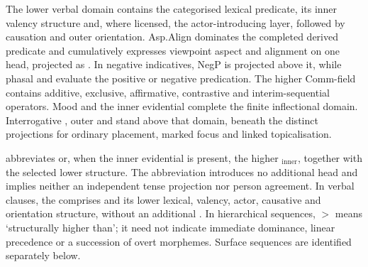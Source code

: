 The lower verbal domain contains the categorised lexical predicate, its inner
valency structure and, where licensed, the actor-introducing layer, followed
by causation and outer orientation. Asp.Align dominates the completed derived
predicate and cumulatively expresses viewpoint aspect and alignment on one
head, projected as . In negative indicatives, NegP is projected
above it, while phasal  and  evaluate the
positive or negative predication. The higher Comm-field contains additive,
exclusive, affirmative, contrastive and interim-sequential operators. Mood
and the inner evidential complete the finite inflectional domain.
Interrogative , outer
 and  stand above that domain, beneath
the distinct projections for ordinary placement, marked focus and linked
topicalisation.

 abbreviates  or, when the inner evidential is
present, the higher $_{\mathrm{inner}}$, together with the
selected lower structure. The abbreviation introduces no additional head and
implies neither an independent tense projection nor person agreement. In
verbal clauses, the  comprises  and
its lower lexical, valency, actor, causative and orientation structure, without an additional
. In hierarchical sequences, $>$ means `structurally higher
than'; it need not indicate immediate dominance, linear precedence or a
succession of overt morphemes. Surface sequences are identified separately
below.

